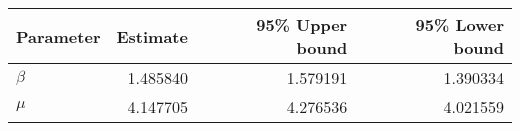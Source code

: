 \begin{tabular}{lrrr}
\toprule
Parameter &  Estimate &  95\% Upper bound &  95\% Lower bound \\
\midrule
  $\beta$ &  1.485840 &          1.579191 &          1.390334 \\
    $\mu$ &  4.147705 &          4.276536 &          4.021559 \\
\bottomrule
\end{tabular}
